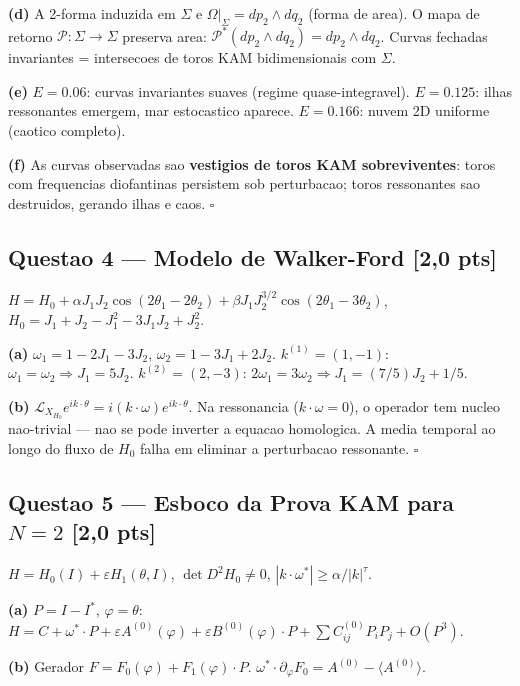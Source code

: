 \documentclass[12pt,a4paper,oneside]{article}
\begin{document}
\textbf{(d)} A 2-forma induzida em $\Sigma$ e $\Omega|_\Sigma = dp_2\wedge
dq_2$ (forma de area). O mapa de retorno $\mathcal{P}: \Sigma \to \Sigma$
preserva area: $\mathcal{P}^*(dp_2\wedge dq_2) = dp_2\wedge dq_2$.
Curvas fechadas invariantes = intersecoes de toros KAM bidimensionais com
$\Sigma$.

\textbf{(e)} $E=0.06$: curvas invariantes suaves (regime quase-integravel).
$E=0.125$: ilhas ressonantes emergem, mar estocastico aparece.
$E=0.166$: nuvem 2D uniforme (caotico completo).

\textbf{(f)} As curvas observadas sao \textbf{vestigios de toros KAM
sobreviventes}: toros com frequencias diofantinas persistem sob perturbacao;
toros ressonantes sao destruidos, gerando ilhas e caos. $\square$

\subsection{Questao 4 — Modelo de Walker-Ford [2,0 pts]}

$H = H_0 + \alpha J_1J_2\cos(2\theta_1-2\theta_2) +
\beta J_1J_2^{3/2}\cos(2\theta_1-3\theta_2)$,
$H_0 = J_1+J_2-J_1^2-3J_1J_2+J_2^2$.

\textbf{(a)} $\omega_1 = 1-2J_1-3J_2$, $\omega_2 = 1-3J_1+2J_2$.
$k^{(1)}=(1,-1)$: $\omega_1=\omega_2 \Rightarrow J_1=5J_2$.
$k^{(2)}=(2,-3)$: $2\omega_1=3\omega_2 \Rightarrow J_1=(7/5)J_2+1/5$.

\textbf{(b)} $\mathcal{L}_{X_{H_0}}e^{ik\cdot\theta}=i(k\cdot\omega)
e^{ik\cdot\theta}$. Na ressonancia ($k\cdot\omega=0$), o operador tem
nucleo nao-trivial — nao se pode inverter a equacao homologica. A media
temporal ao longo do fluxo de $H_0$ falha em eliminar a perturbacao
ressonante. $\square$

\subsection{Questao 5 — Esboco da Prova KAM para $N=2$ [2,0 pts]}

$H = H_0(I) + \varepsilon H_1(\theta,I)$, $\det D^2H_0 \neq 0$,
$|k\cdot\omega^*| \geq \alpha/|k|^\tau$.

\textbf{(a)} $P = I - I^*$, $\varphi = \theta$:
$H = C + \omega^*\cdot P + \varepsilon A^{(0)}(\varphi) +
\varepsilon B^{(0)}(\varphi)\cdot P + \sum C_{ij}^{(0)}P_iP_j + O(P^3)$.

\textbf{(b)} Gerador $F = F_0(\varphi) + F_1(\varphi)\cdot P$.
$\omega^*\cdot\partial_\varphi F_0 = A^{(0)} - \langle A^{(0)}\rangle$.
\end{document}

